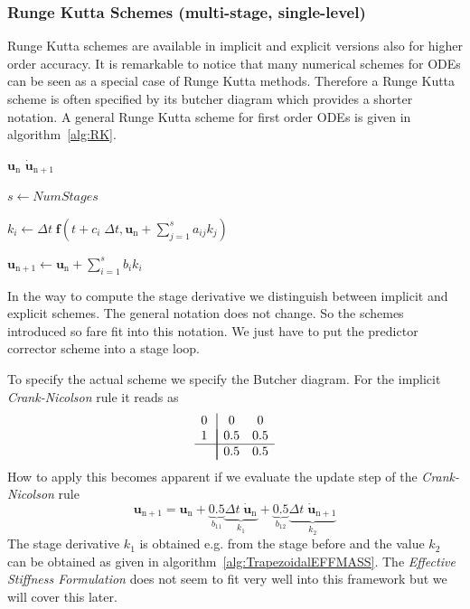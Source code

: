 \subsubsection[Runge Kutta Schemes]{Runge Kutta Schemes  (multi-stage, single-level)}
Runge Kutta schemes are available in implicit and explicit versions also for higher order accuracy.
It is remarkable to notice that many numerical schemes for ODEs can be seen as a special case of Runge
Kutta methods. Therefore a Runge Kutta scheme is often specified by its butcher diagram which
provides a shorter notation. A general Runge Kutta scheme for first order ODEs is given in
algorithm~\ref{alg:RK}.
\begin{algorithm}
\caption{General Runge Kutta Scheme} \label{alg:RK}
\begin{algorithmic}
\REQUIRE $\mathbf{u}_{\mathrm{n}}$
\ENSURE  $\mathbf{\dot{u}}_{\mathrm{n}+1}$

\STATE $s \gets NumStages$

\STATE {}
\STATE $k_i \gets \Delta t\; \mathbf{f}(t+c_i\;\Delta t,\mathbf{u}_{\mathrm{n}} + \sum_{j=1}^{s} a_{ij} k_j)$
\ENDFOR

\STATE {}
\STATE $\mathbf{u}_{\mathrm{n}+1} \gets \mathbf{u}_{\mathrm{n}} + \sum_{i=1}^s b_i k_i$
\end{algorithmic}
\end{algorithm}
In the way to compute the stage derivative we distinguish between implicit and explicit schemes. The
general notation does not change. So the schemes introduced so fare fit into this notation. We just
have to put the predictor corrector scheme into a stage loop.

To specify the actual scheme we specify the Butcher diagram. For the implicit {\it Crank-Nicolson} rule it
reads as
\begin{equation}
\begin{array}{c|!{\vrule width 0.5pt}cc}
0 & 0 & 0 \\
1 & 0.5 & 0.5 \\
\hline
& 0.5 & 0.5
\end{array}
\end{equation}
How to apply this becomes apparent if we evaluate the update step of the {\it Crank-Nicolson} rule 
\begin{equation}
\mathbf{u}_{\mathrm{n}+1} = \mathbf{u}_{\mathrm{n}} + \underbrace{0.5}_{b_{11}}
\underbrace{\Delta t\;\mathbf{\dot{u}}_{\mathrm{n}}}_{k_1} + \underbrace{0.5}_{b_{12}}
\underbrace{\Delta t\;\mathbf{\dot{u}}_{\mathrm{n} +1}}_{k_2}
\end{equation}
The stage derivative $k_1$ is obtained e.g. from the stage before and the value $k_2$ can be
obtained as given in algorithm~\ref{alg:TrapezoidalEFFMASS}. The {\it Effective Stiffness Formulation}
does not seem to fit very well into this framework but we will cover this later.

